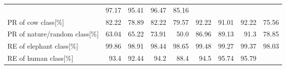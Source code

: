 \begin{table}[!htbp]
{\begin{tabular}{lrrrrrrrr}
                                        & \cellcolor{tbgreen}  97.17 
                                        & \cellcolor{tbyellow} 95.41 
                                        & \cellcolor{tbgreeny} 96.47
                                        & \cellcolor{tbred}    85.16 \\
        PR of cow class[\%]             & \cellcolor{tbyellow} 82.22 
                                        & \cellcolor{tbyellow} 78.89 
                                        & \cellcolor{tbyellow} 82.22 
                                        & \cellcolor{tbyellow} 79.57 
                                        & \cellcolor{tbgreen}  92.22 
                                        & \cellcolor{tbgreeny} 91.01 
                                        & \cellcolor{tbgreen}  92.22 
                                        & \cellcolor{tbred}    75.56 \\
        PR of nature/random class[\%]   & \cellcolor{tbyellow} 63.04 
                                        & \cellcolor{tbyellow} 65.22 
                                        & \cellcolor{tbyellow} 73.91 
                                        & \cellcolor{tbred}    50.0  
                                        & \cellcolor{tbgreeny} 86.96 
                                        & \cellcolor{tbgreeny} 89.13 
                                        & \cellcolor{tbgreen}  91.3 
                                        & \cellcolor{tbyellow} 78.85 \\\midrule
        RE of elephant class[\%]        & \cellcolor{tbgreen}  99.86 
                                        & \cellcolor{tbyellow} 98.91 
                                        & \cellcolor{tbyellow} 98.44 
                                        & \cellcolor{tbyellow} 98.65 
                                        & \cellcolor{tbgreeny} 99.48 
                                        & \cellcolor{tbgreeny} 99.27 
                                        & \cellcolor{tbgreeny} 99.37 
                                        & \cellcolor{tbred}    98.03 \\
        RE of human class[\%]           & \cellcolor{tbyellow} 93.4  
                                        & \cellcolor{tbyellow} 92.44 
                                        & \cellcolor{tbgreeny} 94.2  
                                        & \cellcolor{tbred}    88.4  
                                        & \cellcolor{tbgreeny} 94.5  
                                        & \cellcolor{tbgreen}  95.74 
                                        & \cellcolor{tbgreen}  95.79 

\end{tabular}}
\end{table}
